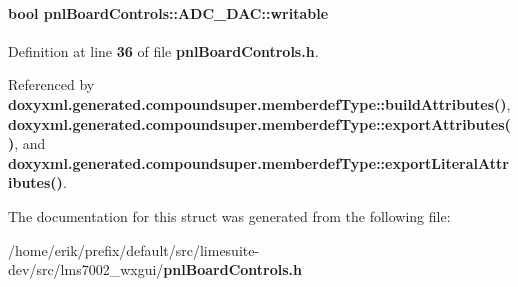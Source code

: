 \paragraph[{writable}]{\setlength{\rightskip}{0pt plus 5cm}bool pnl\+Board\+Controls\+::\+A\+D\+C\+\_\+\+D\+A\+C\+::writable}\label{structpnlBoardControls_1_1ADC__DAC_aaf2f63805b6c493490ac6d409abc1733}


Definition at line {\bf 36} of file {\bf pnl\+Board\+Controls.\+h}.



Referenced by {\bf doxyxml.\+generated.\+compoundsuper.\+memberdef\+Type\+::build\+Attributes()}, {\bf doxyxml.\+generated.\+compoundsuper.\+memberdef\+Type\+::export\+Attributes()}, and {\bf doxyxml.\+generated.\+compoundsuper.\+memberdef\+Type\+::export\+Literal\+Attributes()}.



The documentation for this struct was generated from the following file\+:\begin{DoxyCompactItemize}
\item 
/home/erik/prefix/default/src/limesuite-\/dev/src/lms7002\+\_\+wxgui/{\bf pnl\+Board\+Controls.\+h}\end{DoxyCompactItemize}
